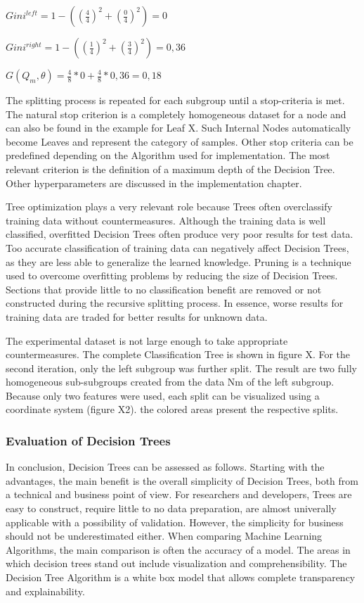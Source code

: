 \(Gini^{left}  = 1 - ((\frac{4}{4})^2 + (\frac{0}{4})^2) = 0 \)

\(Gini^{right} = 1 - ((\frac{1}{4})^2 + (\frac{3}{4})^2) = 0,36 \)

\(G(Q_{m},\theta) = \frac{4}{8} * 0 + \frac{4}{8} * 0,36 = 0,18 \)

The splitting process is repeated for each subgroup until a stop-criteria is met. The natural 
stop criterion is a completely homogeneous dataset for a node and can also be found in the 
example for Leaf X. Such Internal Nodes automatically become Leaves and represent the category 
of samples. Other stop criteria can be predefined depending on the Algorithm used for 
implementation. The most relevant criterion is the definition of a maximum depth of the Decision 
Tree. Other hyperparameters are discussed in the implementation chapter. 

Tree optimization plays a very relevant role because Trees often overclassify training data 
without countermeasures. Although the training data is well classified, overfitted Decision 
Trees often produce very poor results for test data. Too accurate classification of training 
data can negatively affect Decision Trees, as they are less able to generalize the learned 
knowledge. Pruning is a technique used to overcome overfitting problems by reducing the size of 
Decision Trees. Sections that provide little to no classification benefit are removed or not 
constructed during the recursive splitting process. In essence, worse results for training data 
are traded for better results for unknown data.

The experimental dataset is not large enough to take appropriate countermeasures. The complete 
Classification Tree is shown in figure X. For the second iteration, only the left subgroup was 
further split. The result are two fully homogeneous sub-subgroups created from the data Nm of the 
left subgroup. Because only two features were used, each split can be visualized using a 
coordinate system (figure X2). the colored areas present the respective splits.

\subsubsection{Evaluation of Decision Trees}

In conclusion, Decision Trees can be assessed as follows. Starting with the advantages,
the main benefit is the overall simplicity of Decision Trees, both from a technical and 
business point of view. For researchers and developers, Trees are easy to construct, require little
to no data preparation, are almost univerally applicable with a possibility of validation. 
However, the simplicity for business should not be underestimated either. When comparing Machine
Learning Algorithms, the main comparison is often the accuracy of a model. The areas in which 
decision trees stand out include visualization and comprehensibility. The Decision Tree Algorithm 
is a white box model that allows complete transparency and explainability. 

